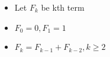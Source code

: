 \documentclass[preview]{standalone}
\begin{document}
\begin{center}
\begin{itemize} \item Let $F_k$ be kth term \\ \item $F_0 = 0, F_1 = 1$ \\ \item $F_k = F_{k -1} + F_{k - 2}, k \ge 2$ \end{itemize}
\end{center}
\end{document}
